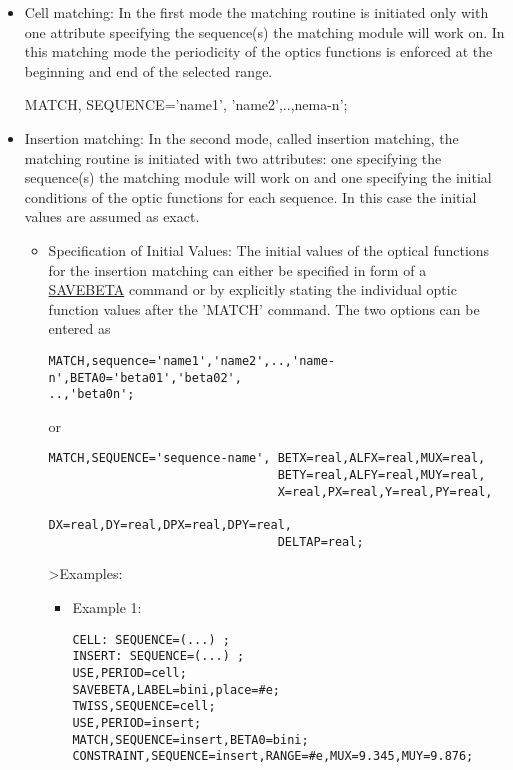 \begin{itemize}
	\item Cell matching:
In the first mode the matching routine is initiated only with one attribute specifying the sequence(s) the matching module will work on. In this matching mode the periodicity of the optics functions is enforced at the beginning and end of the selected range.

MATCH, SEQUENCE='name1', 'name2',..,nema-n';
 
	\item Insertion matching:
 In the second mode, called insertion matching, the matching routine is initiated with two attributes: one specifying the sequence(s) the matching module will work on and one specifying the initial conditions of the optic functions for each sequence. In this case the initial values are assumed as exact.
 
\begin{itemize}
	\item 
 Specification of Initial Values: The initial values of the optical functions  for the insertion matching can either be specified in form of a \href{../control/general.html#savebeta}{SAVEBETA} command or by explicitly stating the individual optic function values after the 'MATCH' command. The two options can be entered as
 
\begin{verbatim}
MATCH,sequence='name1','name2',..,'name-n',BETA0='beta01','beta02',
..,'beta0n';
\end{verbatim}

or
\begin{verbatim}
MATCH,SEQUENCE='sequence-name', BETX=real,ALFX=real,MUX=real,
                                BETY=real,ALFY=real,MUY=real,
                                X=real,PX=real,Y=real,PY=real,
                                DX=real,DY=real,DPX=real,DPY=real,
                                DELTAP=real;
\end{verbatim}

\textgreater Examples:
 
\begin{itemize}
	\item Example 1:

\begin{verbatim}
CELL: SEQUENCE=(...) ;
INSERT: SEQUENCE=(...) ;
USE,PERIOD=cell;
SAVEBETA,LABEL=bini,place=#e;
TWISS,SEQUENCE=cell;
USE,PERIOD=insert;
MATCH,SEQUENCE=insert,BETA0=bini;
CONSTRAINT,SEQUENCE=insert,RANGE=#e,MUX=9.345,MUY=9.876;
\end{verbatim}


\end{itemize}
\end{itemize}
\end{itemize}
